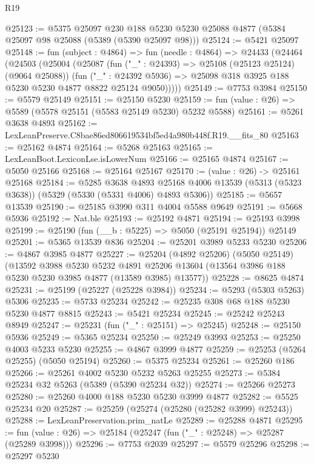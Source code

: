 \begin{lexlean}{R19}
\begin{coremodule}
@25123 := @5375
    @25097
    @230
    @188
    @5230
    @5230
    @25088
    @4877
    (@5384 @25097 @98 @25088 (@5389 (@5390 @25097 @98)))
@25124 := @5421 @25097
@25148 := fun (subject : @4864) =>
  fun (needle : @4864) =>
  @24433
    (@24464
      (@24503
        (@25004
          (@25087
            (fun ("_" : @24393) => @25108 (@25123 @25124) (@9064 @25088))
            (fun ("_" : @24392 @5936) =>
            @25098 @318 @3925 @188 @5230 @5230 @4877 @8822 @25124 @9050)))))
@25149 := @7753 @3984
@25150 := @5579 @25149
@25151 := @25150 @5230
@25159 := fun (value : @26) => @5589 (@5578 @25151 (@5583 @25149 @5230) @5232 @5588)
@25161 := @5261 @3638 @4893
@25162 := LexLeanPreserve.C8bae86ed806619534bf5ed4a980b448f.R19.__fits_80
@25163 := @25162 @4874
@25164 := @5268 @25163
@25165 := LexLeanBoot.LexiconLse.isLowerNum
@25166 := @25165 @4874
@25167 := @5050 @25166
@25168 := @25164 @25167
@25170 := (value : @26) -> @25161 @25168
@25184 := @5285
    @3638
    @4893
    @25168
    @4006
    @13539
    (@5313 (@5323 @3638))
    (@5329 (@5330 (@5331 @4006) @4893 @5306))
@25185 := @5657 @13539
@25190 := @25185 @3990 @311 @4004 @5588 @9649
@25191 := @5668 @5936
@25192 := Nat.ble
@25193 := @25192 @4871
@25194 := @25193 @3998
@25199 := @25190 (fun (__b : @5225) => @5050 (@25191 @25194)) @25149
@25201 := @5365 @13539 @836
@25204 := @25201 @3989 @5233 @5230
@25206 := @4867 @3985 @4877
@25227 := @25204
    (@4892 @25206)
    (@5050 @25149)
    (@13592
      @3988
      @5230
      @5232
      @4891
      @25206
      @13604
      (@13564 @3986 @188 @5230 @5230 @3985 @4877 (@13589 @3985) @13577))
@25228 := @8625 @4874
@25231 := @25199 (@25227 (@25228 @3984))
@25234 := @5293 (@5303 @5263) @5306
@25235 := @5733 @25234
@25242 := @25235 @308 @68 @188 @5230 @5230 @4877 @8815
@25243 := @5421 @25234
@25245 := @25242 @25243 @8949
@25247 := @25231 (fun ("_" : @25151) => @25245)
@25248 := @25150 @5936
@25249 := @5365 @25234
@25250 := @25249 @3993
@25253 := @25250 @4003 @5233 @5230
@25255 := @4867 @3999 @4877
@25259 := @25253 (@5264 @25255) (@5050 @25194)
@25260 := @5375 @25234
@25261 := @25260 @186
@25266 := @25261 @4002 @5230 @5232 @5263 @25255
@25273 := @5384 @25234 @32 @5263 (@5389 (@5390 @25234 @32))
@25274 := @25266 @25273
@25280 := @25260 @4000 @188 @5230 @5230 @3999 @4877
@25282 := @5525 @25234 @20
@25287 := @25259 (@25274 (@25280 (@25282 @3999) @25243))
@25288 := LexLeanPreservation.prim_natLe
@25289 := @25288 @4871
@25295 := fun (value : @26) => @25184 (@25247 (fun ("_" : @25248) => @25287 (@25289 @3998)))
@25296 := @7753 @2039
@25297 := @5579 @25296
@25298 := @25297 @5230

\end{coremodule}
\end{lexlean}
